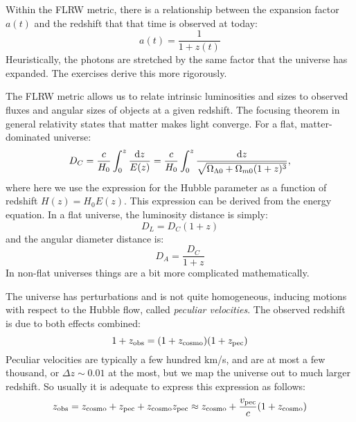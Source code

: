 Within the FLRW metric, there is a relationship between the expansion
factor $a(t)$ and the redshift that that time is observed at today:
\begin{equation}
a(t) = \frac{1}{1+z(t)}
\end{equation}
Heuristically, the photons are stretched by the same factor that the
universe has expanded. The exercises derive this more rigorously. 

The FLRW metric allows us to relate intrinsic luminosities and sizes
to observed fluxes and angular sizes of objects at a given
redshift. The focusing theorem in general relativity states that
matter makes light converge. For a flat, matter-dominated universe:
\begin{equation}
D_C= 
\frac{c}{H_0} \int_0^z \frac{{\rm d}z}{E(z)}
= 
\frac{c}{H_0} \int_0^z \frac{{\rm d}z}{\sqrt{\Omega_{\Lambda0} +
    \Omega_{m0}(1+z)^3}},
\end{equation}
where here we use the expression for the Hubble parameter as a
function of redshift $H(z) = H_0 E(z)$.  This expression can be
derived from the energy equation. In a flat universe, the luminosity
distance is simply:
\begin{equation}
D_L = D_C (1+z)
\end{equation}
and the angular diameter distance is:
\begin{equation}
D_A = \frac{D_C}{1+z}
\end{equation}
In non-flat universes things are a bit more complicated
mathematically.

The universe has perturbations and is not quite homogeneous, inducing
motions with respect to the Hubble flow, called {\it peculiar
velocities}.  The observed redshift is due to both effects combined:
\begin{equation}
1+z_{\rm obs} = (1+z_{\rm cosmo})(1+z_{\rm pec})
\end{equation}
Peculiar velocities are typically a few hundred km/s, and are at most
a few thousand, or $\Delta z \sim 0.01$ at the most, but we map the
universe out to much larger redshift. So usually it is adequate to
express this expression as follows:
\begin{equation}
z_{\rm obs} = z_{\rm cosmo}+z_{\rm pec} + z_{\rm cosmo}z_{\rm pec}
\approx z_{\rm cosmo} + \frac{v_{\rm pec}}{c} (1+z_{\rm cosmo})
\end{equation}


